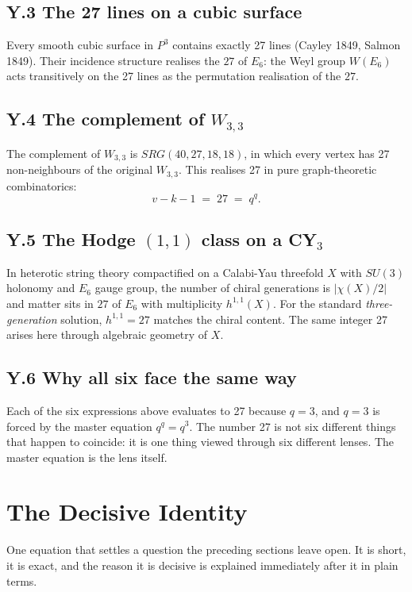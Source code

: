 \documentclass[12pt,a4paper]{article}
\def\mathbb#1{#1}%
\def\mathrm#1{#1}%
\def\mathbf#1{#1}%
\theoremstyle{definition}
\newcommand{\SRG}{\mathrm{SRG}}
\newcommand{\SU}{\mathrm{SU}}
\begin{document}
\subsection*{Y.3 \quad The 27 lines on a cubic surface}
Every smooth cubic surface in $\mathbb{P}^3$ contains exactly 27 lines
(Cayley 1849, Salmon 1849). Their incidence structure realises the
$\mathbf{27}$ of $E_6$: the Weyl group $W(E_6)$ acts transitively on
the 27 lines as the permutation realisation of the $\mathbf{27}$.

\subsection*{Y.4 \quad The complement of $W_{3,3}$}
The complement of $W_{3,3}$ is $\SRG(40,27,18,18)$, in which every
vertex has 27 non-neighbours of the original $W_{3,3}$. This realises
27 in pure graph-theoretic combinatorics:
\[
v - k - 1 \;=\; 27 \;=\; q^q.
\]

\subsection*{Y.5 \quad The Hodge $(1,1)$ class on a CY$_3$}
In heterotic string theory compactified on a Calabi-Yau threefold
$X$ with $\SU(3)$ holonomy and $E_6$ gauge group, the number of
chiral generations is $|\chi(X)/2|$ and matter sits in $\mathbf{27}$
of $E_6$ with multiplicity $h^{1,1}(X)$. For the standard
\emph{three-generation} solution, $h^{1,1} = 27$ matches the chiral
content. The same integer 27 arises here through algebraic geometry
of $X$.

\subsection*{Y.6 \quad Why all six face the same way}
Each of the six expressions above evaluates to 27 because $q=3$, and
$q=3$ is forced by the master equation $q^q=q^3$. The number 27 is
not six different things that happen to coincide: it is one thing
viewed through six different lenses. The master equation is the lens
itself.

\section*{The Decisive Identity}

\begin{plainbox}
One equation that settles a question the preceding sections leave open. It is short,
it is exact, and the reason it is decisive is explained immediately after it in plain
terms.
\end{plainbox}
\end{document}

